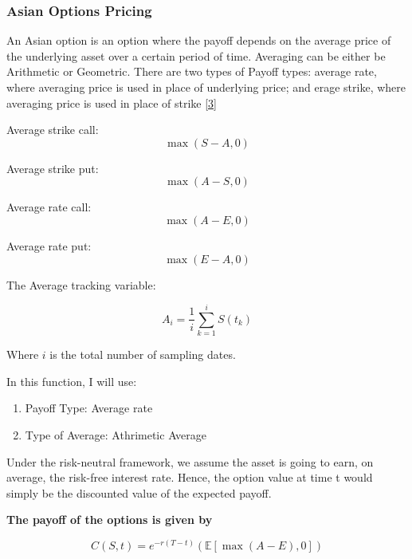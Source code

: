 \documentclass[11pt]{article}
\begin{document}
    \subsubsection{Asian Options Pricing}\label{asian-options-pricing}

    An Asian option is an option where the payoff depends on the average
price of the underlying asset over a certain period of time. Averaging
can be either be Arithmetic or Geometric. There are two types of Payoff
types: average rate, where averaging price is used in place of
underlying price; and erage strike, where averaging price is used in
place of strike \hyperref[3]{[3]}

Average strike call: \[
\max(S-A,0)
\]

Average strike put: \[
\max(A-S,0)
\]

Average rate call: \[
\max(A-E,0)
\]

Average rate put: \[
\max(E-A,0)
\]

    The Average tracking variable:

\[
A_{i}= \frac{1}{i} \sum_{k=1}^{i} S\left(t_{k}\right)
\]

Where \(i\) is the total number of sampling dates.

    In this function, I will use:

\begin{enumerate}
\def\labelenumi{\arabic{enumi}.}
\item
  Payoff Type: Average rate
\item
  Type of Average: Athrimetic Average
\end{enumerate}

    Under the risk-neutral framework, we assume the asset is going to earn,
on average, the risk-free interest rate. Hence, the option value at time
t would simply be the discounted value of the expected payoff.

    \textbf{The payoff of the options is given by}

\[
C(S,t) = e^{-r(T-t)}(\mathbb{E}[\max(A-E),0])
\]
\end{document}

